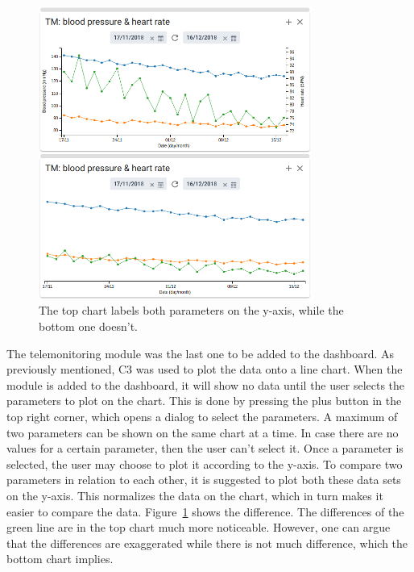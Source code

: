             \begin{figure}[t]
                \centering
                \includegraphics[width=0.8\textwidth]{chapters/4_implementation/tm-compare}
                \caption{The top chart labels both parameters on the y-axis, while the bottom one doesn't.}\label{fig:tm-compare}
            \end{figure}

            The telemonitoring module was the last one to be added to the dashboard. As previously mentioned, C3 was used to plot the data onto a line chart. When the module is added to the dashboard, it will show no data until the user selects the parameters to plot on the chart. This is done by pressing the plus button in the top right corner, which opens a dialog to select the parameters. A maximum of two parameters can be shown on the same chart at a time. In case there are no values for a certain parameter, then the user can't select it. Once a parameter is selected, the user may choose to plot it according to the y-axis. To compare two parameters in relation to each other, it is suggested to plot both these data sets on the y-axis. This normalizes the data on the chart, which in turn makes it easier to compare the data. Figure~\ref{fig:tm-compare} shows the difference. The differences of the green line are in the top chart much more noticeable. However, one can argue that the differences are exaggerated while there is not much difference, which the bottom chart implies.

